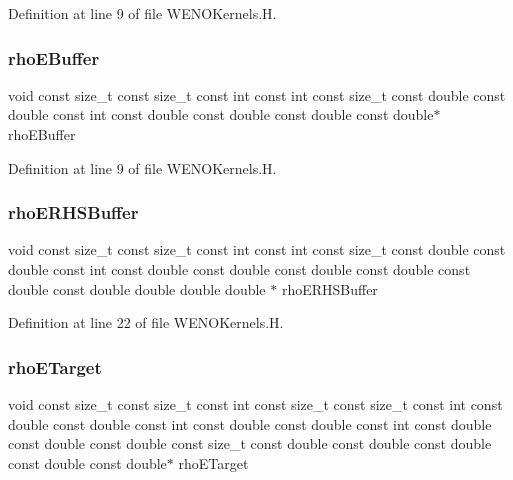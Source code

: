 Definition at line 9 of file W\+E\+N\+O\+Kernels.\+H.

\hypertarget{WENOKernels_8H_a355f99edd58be395aedbe083ffca12b0}{}\label{WENOKernels_8H_a355f99edd58be395aedbe083ffca12b0} 
\subsubsection{\texorpdfstring{rho\+E\+Buffer}{rhoEBuffer}}
{\footnotesize\ttfamily void const size\+\_\+t const size\+\_\+t const int const int const size\+\_\+t const double const double const int const double const double const double const double$\ast$ rho\+E\+Buffer}



Definition at line 9 of file W\+E\+N\+O\+Kernels.\+H.

\hypertarget{WENOKernels_8H_aba07a39911c6761f6f6a5b63b9258c39}{}\label{WENOKernels_8H_aba07a39911c6761f6f6a5b63b9258c39} 
\subsubsection{\texorpdfstring{rho\+E\+R\+H\+S\+Buffer}{rhoERHSBuffer}}
{\footnotesize\ttfamily void const size\+\_\+t const size\+\_\+t const int const int const size\+\_\+t const double const double const int const double const double const double const double const double const double double double double $\ast$ rho\+E\+R\+H\+S\+Buffer}



Definition at line 22 of file W\+E\+N\+O\+Kernels.\+H.

\hypertarget{WENOKernels_8H_ac62021f907a130aa7534b0cb7eb3d0b0}{}\label{WENOKernels_8H_ac62021f907a130aa7534b0cb7eb3d0b0} 
\subsubsection{\texorpdfstring{rho\+E\+Target}{rhoETarget}}
{\footnotesize\ttfamily void const size\+\_\+t const size\+\_\+t const int const size\+\_\+t const size\+\_\+t const int const double const double const int const double const double const int const double const double const double const size\+\_\+t const double const double const double const double const double$\ast$ rho\+E\+Target}



